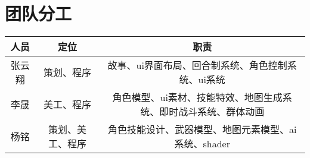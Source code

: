 \documentclass{article}
\begin{document}
\section{团队分工}
\begin{table}[htbp]
	\centering
	\begin{tabular}{|c|c|c|}
		\hline
		人员 & 定位 & 职责 \\
		\hline
		张云翔 & 策划、程序 & 故事、ui界面布局、回合制系统、角色控制系统、ui系统 \\
		\hline
		李晟 & 美工、程序 & 角色模型、ui素材、技能特效、地图生成系统、即时战斗系统、群体动画 \\
		\hline
		杨铭 & 策划、美工、程序 & 角色技能设计、武器模型、地图元素模型、ai系统、shader \\
		\hline
	\end{tabular}
\end{table}
\end{document}
